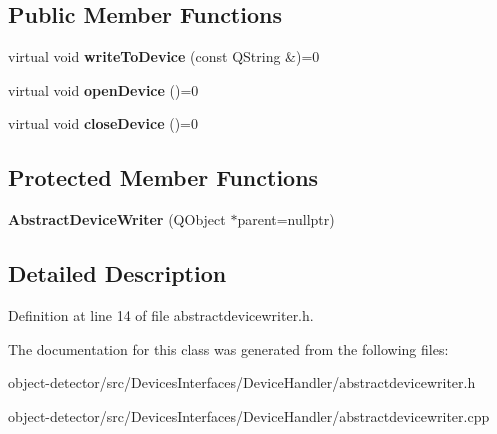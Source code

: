 \subsection*{Public Member Functions}
\begin{DoxyCompactItemize}
\item 
\mbox{\label{class_devices_1_1_abstract_device_writer_a5fad14b09f0fed1f225e45efa7f19122}} 
virtual void {\bfseries write\+To\+Device} (const Q\+String \&)=0
\item 
\mbox{\label{class_devices_1_1_abstract_device_writer_ab0b97c22bd53240a29e997b7e665956d}} 
virtual void {\bfseries open\+Device} ()=0
\item 
\mbox{\label{class_devices_1_1_abstract_device_writer_a04ef6838866f61e59eb56bfff11b3da6}} 
virtual void {\bfseries close\+Device} ()=0
\end{DoxyCompactItemize}
\subsection*{Protected Member Functions}
\begin{DoxyCompactItemize}
\item 
\mbox{\label{class_devices_1_1_abstract_device_writer_a25679076ac5f57cbc317a8c07c1ebf25}} 
{\bfseries Abstract\+Device\+Writer} (Q\+Object $\ast$parent=nullptr)
\end{DoxyCompactItemize}


\subsection{Detailed Description}


Definition at line 14 of file abstractdevicewriter.\+h.



The documentation for this class was generated from the following files\+:\begin{DoxyCompactItemize}
\item 
object-\/detector/src/\+Devices\+Interfaces/\+Device\+Handler/abstractdevicewriter.\+h\item 
object-\/detector/src/\+Devices\+Interfaces/\+Device\+Handler/abstractdevicewriter.\+cpp\end{DoxyCompactItemize}
